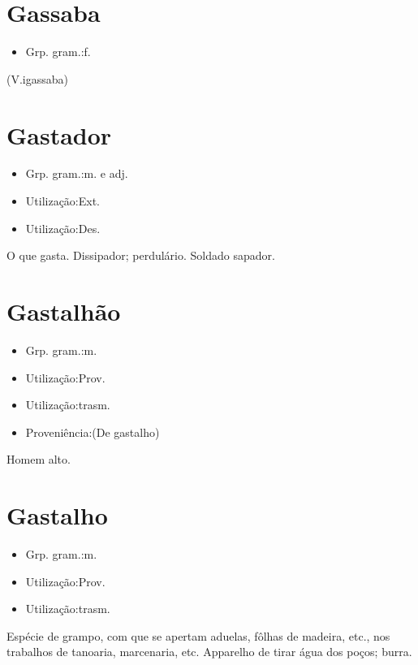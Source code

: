\section{Gassaba}
\begin{itemize}
\item {Grp. gram.:f.}
\end{itemize}
(V.igassaba)
\section{Gastador}
\begin{itemize}
\item {Grp. gram.:m.  e  adj.}
\end{itemize}
\begin{itemize}
\item {Utilização:Ext.}
\end{itemize}
\begin{itemize}
\item {Utilização:Des.}
\end{itemize}
O que gasta.
Dissipador; perdulário.
Soldado sapador.
\section{Gastalhão}
\begin{itemize}
\item {Grp. gram.:m.}
\end{itemize}
\begin{itemize}
\item {Utilização:Prov.}
\end{itemize}
\begin{itemize}
\item {Utilização:trasm.}
\end{itemize}
\begin{itemize}
\item {Proveniência:(De \textunderscore gastalho\textunderscore )}
\end{itemize}
Homem alto.
\section{Gastalho}
\begin{itemize}
\item {Grp. gram.:m.}
\end{itemize}
\begin{itemize}
\item {Utilização:Prov.}
\end{itemize}
\begin{itemize}
\item {Utilização:trasm.}
\end{itemize}
Espécie de grampo, com que se apertam aduelas, fôlhas de madeira, etc., nos trabalhos de tanoaria, marcenaria, etc.
Apparelho de tirar água dos poços; burra.
